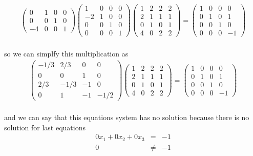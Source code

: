 \documentclass[11pt]{article}
\begin{document}
\begin{eqnarray*}
\begin{pmatrix}
	0 & 1 & 0 & 0\\
	0 & 0 & 1 & 0\\
	-4 & 0 & 0 & 1
\end{pmatrix}
\begin{pmatrix}
	1 & 0 & 0 & 0\\
	-2 & 1 & 0 & 0\\
	0 & 0 & 1 & 0\\
	0 & 0 & 0 & 1
\end{pmatrix}
\left(\begin{array}{ccc|c}  
	1 & 2 & 2 & 2\\
    2 & 1 & 1 & 1\\
    0 & 1 & 0 & 1\\
    4 & 0 & 2 & 2
\end{array}\right)
=
\left(\begin{array}{ccc|c}  
	1 & 0 & 0 & 0\\
    0 & 1 & 0 & 1\\
    0 & 0 & 1 & 0\\
    0 & 0 & 0 & -1
\end{array}\right)
\end{eqnarray*}
\paragraph{}so we can simplfy this multiplication as
\begin{eqnarray*}
\begin{pmatrix}
	-1/3 & 2/3 & 0 & 0\\
	0 & 0 & 1 & 0\\
	2/3 & -1/3 & -1 & 0\\
	0 & 1 & -1 & -1/2
\end{pmatrix}
\left(\begin{array}{ccc|c}  
	1 & 2 & 2 & 2\\
    2 & 1 & 1 & 1\\
    0 & 1 & 0 & 1\\
    4 & 0 & 2 & 2
\end{array}\right)
=
\left(\begin{array}{ccc|c}  
	1 & 0 & 0 & 0\\
    0 & 1 & 0 & 1\\
    0 & 0 & 1 & 0\\
    0 & 0 & 0 & -1
\end{array}\right)
\end{eqnarray*}
\paragraph{}and we can say that this equations system has no solution because there is no solution for last equations
\begin{eqnarray*}
0x_1+0x_2+0x_3&=&-1
\\0&\neq&-1
\end{eqnarray*}
\end{document}
